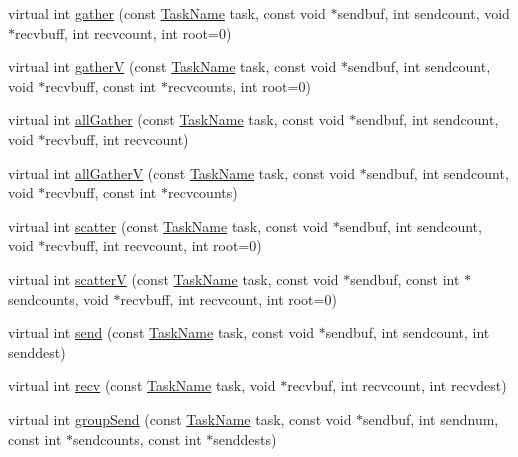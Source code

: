 \begin{DoxyCompactItemize}
\item 
virtual int \hyperlink{classHSF_1_1Communicator_a27fd4507bb56bef2605e6f8d52fa5fb3}{gather} (const \hyperlink{namespaceHSF_a928eb958edfcd09f62de19e9cd3bac70}{TaskName} task, const void $\ast$sendbuf, int sendcount, void $\ast$recvbuff, int recvcount, int root=0)
\item 
virtual int \hyperlink{classHSF_1_1Communicator_a26c56ac757a53a2627babfe4ad655215}{gatherV} (const \hyperlink{namespaceHSF_a928eb958edfcd09f62de19e9cd3bac70}{TaskName} task, const void $\ast$sendbuf, int sendcount, void $\ast$recvbuff, const int $\ast$recvcounts, int root=0)
\item 
virtual int \hyperlink{classHSF_1_1Communicator_a5ed8822c246260f867db03b07e914a45}{allGather} (const \hyperlink{namespaceHSF_a928eb958edfcd09f62de19e9cd3bac70}{TaskName} task, const void $\ast$sendbuf, int sendcount, void $\ast$recvbuff, int recvcount)
\item 
virtual int \hyperlink{classHSF_1_1Communicator_a1ab5360c4fe2a01291e223dcd5b48a67}{allGatherV} (const \hyperlink{namespaceHSF_a928eb958edfcd09f62de19e9cd3bac70}{TaskName} task, const void $\ast$sendbuf, int sendcount, void $\ast$recvbuff, const int $\ast$recvcounts)
\item 
virtual int \hyperlink{classHSF_1_1Communicator_a421c23c24d63ffc349d4e5d44c9fea43}{scatter} (const \hyperlink{namespaceHSF_a928eb958edfcd09f62de19e9cd3bac70}{TaskName} task, const void $\ast$sendbuf, int sendcount, void $\ast$recvbuff, int recvcount, int root=0)
\item 
virtual int \hyperlink{classHSF_1_1Communicator_a1678c6aa967e7aa1a54f760c8e6abeaa}{scatterV} (const \hyperlink{namespaceHSF_a928eb958edfcd09f62de19e9cd3bac70}{TaskName} task, const void $\ast$sendbuf, const int $\ast$sendcounts, void $\ast$recvbuff, int recvcount, int root=0)
\item 
virtual int \hyperlink{classHSF_1_1Communicator_ab1aebbfbbeaf4275b5d127f791a1a00b}{send} (const \hyperlink{namespaceHSF_a928eb958edfcd09f62de19e9cd3bac70}{TaskName} task, const void $\ast$sendbuf, int sendcount, int senddest)
\item 
virtual int \hyperlink{classHSF_1_1Communicator_a698780dd247832a2f3f0178f3dfce270}{recv} (const \hyperlink{namespaceHSF_a928eb958edfcd09f62de19e9cd3bac70}{TaskName} task, void $\ast$recvbuf, int recvcount, int recvdest)
\item 
virtual int \hyperlink{classHSF_1_1Communicator_a9fd860c63129153fd3951050b6f89c5b}{groupSend} (const \hyperlink{namespaceHSF_a928eb958edfcd09f62de19e9cd3bac70}{TaskName} task, const void $\ast$sendbuf, int sendnum, const int $\ast$sendcounts, const int $\ast$senddests)

\end{DoxyCompactItemize}
